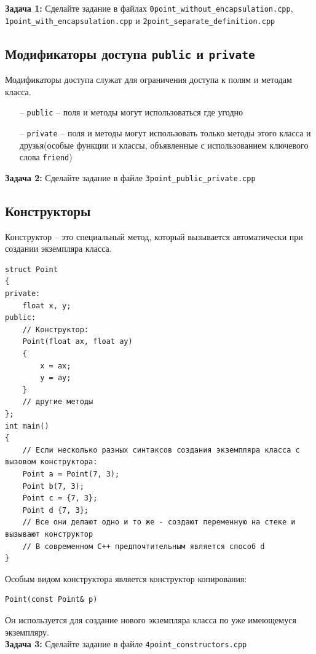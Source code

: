 \documentclass{article}
\begin{document}
\textbf{Задача 1:} Сделайте задание в файлах \texttt{0point\_without\_encapsulation.cpp}, \texttt{1point\_with\_encapsulation.cpp} и 
\texttt{2point\_separate\_definition.cpp}

\newpage

\subsection*{Модификаторы доступа \texttt{public} и \texttt{private}}
Модификаторы доступа служат для ограничения доступа к полям и методам класса.
\begin{itemize}
\item[--] \texttt{public} -- поля и методы могут использоваться где угодно
\item[--] \texttt{private} -- поля и методы могут использовать только методы этого класса и друзья(особые функции и классы, объявленные с использованием ключевого слова \texttt{friend})
\end{itemize}
\textbf{Задача 2:} Сделайте задание в файле \texttt{3point\_public\_private.cpp}
\subsection*{Конструкторы}
Конструктор -- это специальный метод, который вызывается автоматически при создании экземпляра класса.
\begin{lstlisting}
struct Point
{
private:
	float x, y;
public:
	// Конструктор:
	Point(float ax, float ay)
	{
		x = ax;
		y = ay;
	}
	// другие методы
};
int main()
{
	// Если несколько разных синтаксов создания экземпляра класса с вызовом конструктора:
	Point a = Point(7, 3);
	Point b(7, 3);
	Point c = {7, 3};
	Point d {7, 3};
	// Все они делают одно и то же - создают переменную на стеке и вызывают конструктор
	// В современном C++ предпочтительным является способ d
}
\end{lstlisting}
Особым видом конструктора является конструктор копирования:
\begin{lstlisting}
Point(const Point& p)
\end{lstlisting}
Он используется для создание нового экземпляра класса по уже имеющемуся экземпляру.\\
\textbf{Задача 3:} Сделайте задание в файле \texttt{4point\_constructors.cpp}
\end{document}

